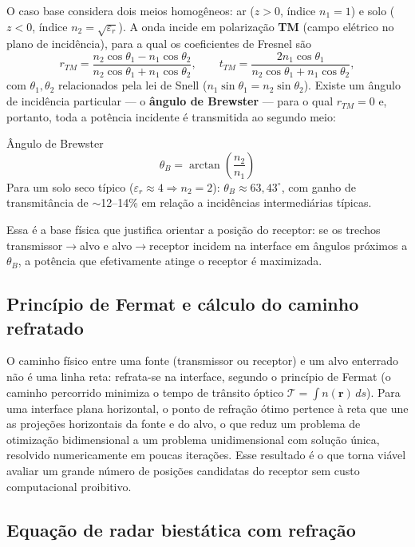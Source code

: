 \documentclass[11pt,a4paper]{article}
\newcommand{\thetaB}{\theta_B}
\newcommand{\nuno}{n_1}
\newcommand{\ndos}{n_2}
\begin{document}
O caso base considera dois meios homogêneos: ar ($z>0$, índice $\nuno=1$) e solo ($z<0$, índice
$\ndos=\sqrt{\varepsilon_r}$). A onda incide em polarização \textbf{TM} (campo elétrico no plano
de incidência), para a qual os coeficientes de Fresnel são
\[
r_{TM} = \frac{\ndos\cos\theta_1 - \nuno\cos\theta_2}{\ndos\cos\theta_1 + \nuno\cos\theta_2}, \qquad
t_{TM} = \frac{2\nuno\cos\theta_1}{\ndos\cos\theta_1 + \nuno\cos\theta_2},
\]
com $\theta_1,\theta_2$ relacionados pela lei de Snell ($\nuno\sin\theta_1=\ndos\sin\theta_2$).
Existe um ângulo de incidência particular — o \textbf{ângulo de Brewster} — para o qual $r_{TM}=0$
e, portanto, toda a potência incidente é transmitida ao segundo meio:
\begin{resultado}{Ângulo de Brewster}
\[
\boxed{\thetaB = \arctan\!\left(\frac{\ndos}{\nuno}\right)}
\]
Para um solo seco típico ($\varepsilon_r\approx 4 \Rightarrow \ndos=2$): $\thetaB\approx
63{,}43^\circ$, com ganho de transmitância de $\sim$12--14\% em relação a incidências
intermediárias típicas.
\end{resultado}

Essa é a base física que justifica orientar a posição do receptor: se os trechos
transmissor$\to$alvo e alvo$\to$receptor incidem na interface em ângulos próximos a $\thetaB$, a
potência que efetivamente atinge o receptor é maximizada.

\subsection{Princípio de Fermat e cálculo do caminho refratado}

O caminho físico entre uma fonte (transmissor ou receptor) e um alvo enterrado não é uma linha
reta: refrata-se na interface, segundo o princípio de Fermat (o caminho percorrido minimiza o
tempo de trânsito óptico $\mathcal{T}=\int n(\bm r)\,ds$). Para uma interface plana horizontal, o
ponto de refração ótimo pertence à reta que une as projeções horizontais da fonte e do alvo, o que
reduz um problema de otimização bidimensional a um problema unidimensional com solução única,
resolvido numericamente em poucas iterações. Esse resultado é o que torna viável avaliar um grande
número de posições candidatas do receptor sem custo computacional proibitivo.

\subsection{Equação de radar biestática com refração}
\end{document}
